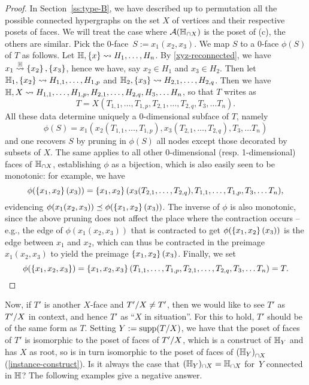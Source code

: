 \begin{proof}
In Section~\ref{ss:type-B}, we have described up to permutation all the possible connected hypergraphs on the set $X$ of vertices and their respective posets of faces. 
We will treat the case where ${\cal A}({\mathbb H}_{\cap X})$ is the poset of (c), the others are similar.
Pick the 0-face~$S:= x_1(x_2,x_3)$. 
We map $S$ to a $0$-face $\phi(S)$ of $T$ as follows. 
Let ${\mathbb H},\left\{x\right\}\leadsto H_1,\ldots,H_n$. 
By \cref{xyz-reconnected}, we have $x_1\stackrel{{\mathbb H}}{\rightsquigarrow}\left\{x_2\right\},\left\{x_3\right\}$, hence we have, say $x_2\in H_1$ and $x_3\in H_2$. Then let
  ${\mathbb H_1},\left\{x_2\right\}\leadsto H_{1,1},\ldots,H_{1,p}$ and ${\mathbb H_2},\left\{x_3\right\}\leadsto H_{2,1},\ldots,H_{2,q}$.
  Then we have ${\mathbb H},X\leadsto H_{1,1},\ldots,H_{1,p},H_{2,1},\ldots,H_{2,q},H_3,\ldots H_n$, so that $T$ writes as
  $$T= X(T_{1,1},\ldots,T_{1,p},T_{2,1},\ldots,T_{2,q},T_3,\ldots T_n).$$ 
All these data determine uniquely a 0-dimensional subface of $T$, namely
  $$\phi(S)=x_1(x_2(T_{1,1},\ldots,T_{1,p}),x_3(T_{2,1},\ldots,T_{2,q}),T_3,\ldots T_n)$$
 and one recovers $S$
  by  pruning in $\phi(S)$ all nodes except those decorated by subsets of $X$.
  The same applies to all other 0-dimensional (resp. 1-dimensional) faces of ${\mathbb H}_{\cap X}$, establishing $\phi$ as a bijection, which is also easily seen to be monotonic: for example, we have
 $$\phi(\left\{x_1,x_2\right\}(x_3))= \left\{x_1,x_2\right\}(x_3(T_{2,1},\ldots,T_{2,q}),T_{1,1},\ldots,T_{1,p},T_3,\ldots T_n),$$
 evidencing $\phi(x_1(x_2,x_3))\preceq \phi(\left\{x_1,x_2\right\}(x_3))$. 
 The inverse of $\phi$ is also monotonic, since the above pruning does not affect the place where the contraction occurs -- e.g., the edge of $\phi(x_1(x_2,x_3))$ that is contracted to get $\phi(\left\{x_1,x_2\right\}(x_3))$ is the edge between $x_1$ and $x_2$, which can thus be contracted in the preimage $x_1(x_2,x_3)$ to yield the preimage $\left\{x_1,x_2\right\}(x_3)$.
 Finally, we set
 $$\phi(\left\{x_1,x_2,x_3\right\})=\left\{x_1,x_2,x_3\right\}(T_{1,1},\ldots,T_{1,p},T_{2,1},\ldots,T_{2,q},T_3,\ldots T_n)=T.$$
 \end{proof}

Now, if $T'$ is another $X$-face and $T'/X\neq T'$, then we would like to see  $T'$ as $T'/X$ in context, and hence $T'$ as ``$X$ in situation''.  
For this to hold, $T'$ should be of the same form as $T$. 
Setting $Y:=\operatorname{supp}(T/X)$, we have that the poset of faces of $T'$ is isomorphic to the poset of faces of $T'/X$, which is a construct of ${\mathbb H}_Y$ and has $X$ as root, so is in turn isomorphic to the poset of faces of ${\mathbb ({\mathbb H}_Y)}_{\cap X}$ (\cref{instance-construct}).
Is it always the case that $({\mathbb H}_Y)_{\cap X}={\mathbb H}_{\cap X}$ for~$Y$ connected in ${\mathbb H}$? 
The following examples give a negative answer.

